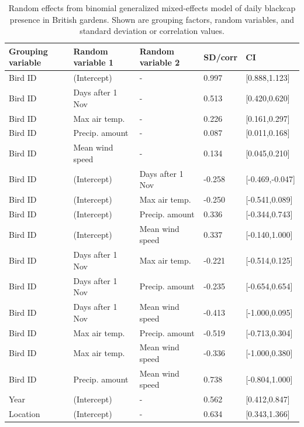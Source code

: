 \documentclass[a4paper, twoside]{templates/ociamthesis}
\begin{document}
\begin{table}[t]

\caption{\label{tab:indiv-model-table}Random effects from binomial generalized mixed-effects model of daily blackcap presence in British gardens. Shown are grouping factors, random variables, and standard deviation or correlation values.}
\centering
\begin{tabular}{l|l|l|l|l}
\hline
Grouping variable & Random variable 1 & Random variable 2 & SD/corr & CI\\
\hline
Bird ID & (Intercept) & - & 0.997 & [0.888,1.123]\\
\hline
Bird ID & Days after 1 Nov & - & 0.513 & [0.420,0.620]\\
\hline
Bird ID & Max air temp. & - & 0.226 & [0.161,0.297]\\
\hline
Bird ID & Precip. amount & - & 0.087 & [0.011,0.168]\\
\hline
Bird ID & Mean wind speed & - & 0.134 & [0.045,0.210]\\
\hline
Bird ID & (Intercept) & Days after 1 Nov & -0.258 & [-0.469,-0.047]\\
\hline
Bird ID & (Intercept) & Max air temp. & -0.250 & [-0.541,0.089]\\
\hline
Bird ID & (Intercept) & Precip. amount & 0.336 & [-0.344,0.743]\\
\hline
Bird ID & (Intercept) & Mean wind speed & 0.337 & [-0.140,1.000]\\
\hline
Bird ID & Days after 1 Nov & Max air temp. & -0.221 & [-0.514,0.125]\\
\hline
Bird ID & Days after 1 Nov & Precip. amount & -0.235 & [-0.654,0.654]\\
\hline
Bird ID & Days after 1 Nov & Mean wind speed & -0.413 & [-1.000,0.095]\\
\hline
Bird ID & Max air temp. & Precip. amount & -0.519 & [-0.713,0.304]\\
\hline
Bird ID & Max air temp. & Mean wind speed & -0.336 & [-1.000,0.380]\\
\hline
Bird ID & Precip. amount & Mean wind speed & 0.738 & [-0.804,1.000]\\
\hline
Year & (Intercept) & - & 0.562 & [0.412,0.847]\\
\hline
Location & (Intercept) & - & 0.634 & [0.343,1.366]\\
\hline
\end{tabular}
\end{table}
\end{document}
